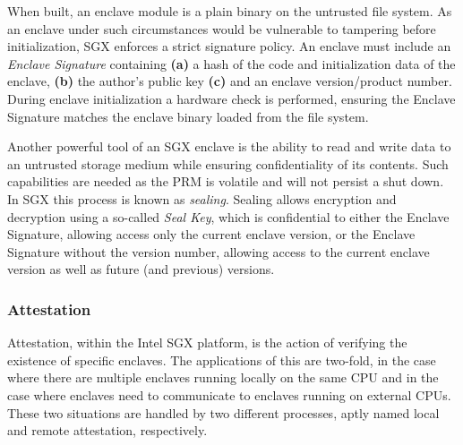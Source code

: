 \documentclass[12pt]{article}
\begin{document}
      When built, an enclave module is a plain binary on the untrusted file system.
      As an enclave under such circumstances would be vulnerable to tampering before initialization, SGX enforces a strict signature policy.
      An enclave must include an \textit{Enclave Signature} containing \textbf{(a)} a hash of the code and initialization data of the enclave, \textbf{(b)} the author's public key \textbf{(c)} and an enclave version/product number.
      During enclave initialization a hardware check is performed, ensuring the Enclave Signature matches the enclave binary loaded from the file system.

      Another powerful tool of an SGX enclave is the ability to read and write data to an untrusted storage medium while ensuring confidentiality of its contents.
      Such capabilities are needed as the PRM is volatile and will not persist a shut down.
      In SGX this process is known as \textit{sealing}.
      Sealing allows encryption and decryption using a so-called \textit{Seal Key}, which is confidential to either the Enclave Signature, allowing access only the current enclave version, or the Enclave Signature without the version number, allowing access to the current enclave version as well as future (and previous) versions.

			\subsubsection{Attestation}
			Attestation, within the Intel SGX platform, is the action of verifying the existence of specific enclaves.
			The applications of this are two-fold, in the case where there are multiple enclaves running locally on the same CPU and in the case where enclaves need to communicate to enclaves running on external CPUs.
			These two situations are handled by two different processes, aptly named local and remote attestation, respectively.
      
\end{document}
